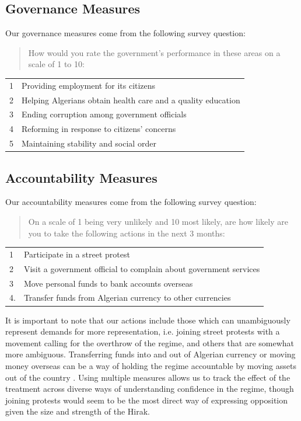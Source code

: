 \documentclass[12pt, letterpaper]{article}
\begin{document}
\subsection*{Governance Measures}

Our governance measures come from the following survey question:

\begin{quotation}
How would you rate the government’s performance in these areas on a scale of 1 to 10:
\end{quotation}

\begin{tabular}{@{}ll@{}}
\toprule 
1 & Providing employment for its citizens \\
2 &Helping Algerians obtain health care and a quality education \\
3 &Ending corruption among government officials \\
4 &Reforming in response to citizens’ concerns \\
5 &Maintaining stability and social order \\ \bottomrule
\end{tabular}

\vspace{1cm}

\subsection*{Accountability Measures}

Our accountability measures come from the following survey question:

\begin{quotation}
On a scale of 1 being very unlikely and 10 most likely, are how likely are you to take the following actions in the next 3 months:
\end{quotation}

\begin{tabular}{@{}ll@{}}
\toprule 
1 & Participate in a street protest \\
2 & Visit a government official to complain about government services \\
3 & Move personal funds to bank accounts overseas \\
4. &Transfer funds from Algerian currency to other currencies \\ \bottomrule
\end{tabular}

It is important to note that our actions include those which can unambiguously represent demands for more representation, i.e. joining street protests with a movement calling for the overthrow of the regime, and others that are somewhat more ambiguous. Transferring funds into and out of Algerian currency or moving money overseas can be a way of holding the regime accountable by moving assets out of the country \parencite{bates_note_1985}. Using multiple measures allows us to track the effect of the treatment across diverse ways of understanding confidence in the regime, though joining protests would seem to be the most direct way of expressing opposition given the size and strength of the Hirak.
\end{document}
